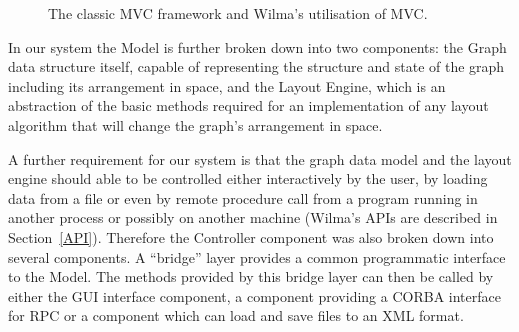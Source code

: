 \documentclass[runningheads]{cl2emult}
\begin{document}
\begin{figure}[h]
  \centering
  \caption{The classic MVC framework and Wilma's utilisation of MVC.}
\end{figure}

In our system the Model is further broken down into two components:
the Graph data structure itself, capable of representing the structure
and state of the graph including its arrangement in space, and
the Layout Engine, which is an abstraction of the basic methods required for
an implementation of any layout algorithm that will change the graph's
arrangement in space.

A further requirement for our system is that the graph data model and
the layout engine should able to be controlled either interactively by
the user, by loading data from a file or even by remote
procedure call from a program running in another process or possibly on
another machine (Wilma's APIs are described in Section~\ref{API}).  Therefore the Controller component was also broken
down into several components.  A ``bridge'' layer provides a common
programmatic interface to the Model.  The methods provided by this
bridge layer can then be called by either the GUI interface component,
a component providing a CORBA interface for RPC or a component which
can load and save files to an XML format.
\end{document}
